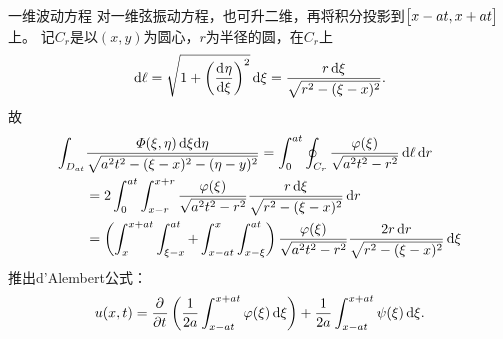 \begin{example}{一维波动方程}{}
	对一维弦振动方程，也可升二维，再将积分投影到$\bigl[x-at,x+at\bigr]$上。
	记$C_r$是以$(x,y)$为圆心，$r$为半径的圆，在$C_r$上
	\begin{gather*}
		\mathop{}\!\mathrm{d}\ell=\sqrt{1+\left(\frac{\mathrm{d}^{{}}\eta}{\mathrm{d}{\xi}^{{}}}\right)^2}\mathop{}\!\mathrm{d}\xi=\frac{r\mathop{}\!\mathrm{d}\xi}{\sqrt{r^2-(\xi-x)^2}}.
	\end{gather*}
	故
	\begin{align*}
		\int_{D_{at}}&\frac{\varPhi(\xi,\eta)\d\xi\nd\eta}{\sqrt{a^2t^2-(\xi-x)^2-(\eta-y)^2}}=\int_0^{at}\oint_{C_r}\frac{\varphi(\xi)}{\sqrt{a^2t^2-r^2}}\d\ell\d r\\
		&=2\int_0^{at}\int_{x-r}^{x+r}\frac{\varphi(\xi)}{\sqrt{a^2t^2-r^2}}\frac{r\d\xi}{\sqrt{r^2-(\xi-x)^2}}\d r\\%
		&=\kh{\int_x^{x+at}\int_{\xi-x}^{at}+\int_{x-at}^x\int_{x-\xi}^{at}}\frac{\varphi(\xi)}{\sqrt{a^2t^2-r^2}}\frac{2r\d r}{\sqrt{r^2-(\xi-x)^2}}\d\xi
	\end{align*}
	推出d'Alembert公式：
	\[
		u(x,t)=\frac{\partial^{{}}}{\partial{t}^{{}}}\left(\frac1{2a}\int_{x-at}^{x+at}\varphi(\xi)\mathop{}\!\mathrm{d}\xi\right)+\frac1{2a}\int_{x-at}^{x+at}\psi(\xi)\mathop{}\!\mathrm{d}\xi.
	\]
\end{example}

